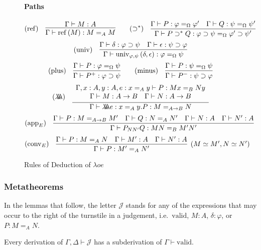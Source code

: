\documentclass[a4paper,UKenglish]{lipics-v2016}
\newcommand*{\reff}[1]{\ensuremath{\mathrm{ref} \left( {#1} \right)}}
\newcommand*{\univ}[4]{\ensuremath{\mathrm{univ}_{{#1}, {#2}} \left({#3} , {#4} \right)}}
\newcommand*{\triplelambda}{\ensuremath{\lambda \!\! \lambda \!\! \lambda}}
\newcommand*{\vald}{\ensuremath{\vdash \mathrm{valid}}}
\theoremstyle{plain}
\theoremstyle{definition}
\begin{document}
\begin{figure}
\paragraph*{Paths}
\[ (\mathrm{ref}) \quad \vcenter{\infer{\Gamma \vdash \reff{M} : M =_A M}{\Gamma \vdash M : A}}
\qquad
(\supset^*) \quad \vcenter{\infer{\Gamma \vdash P \supset^* Q : \varphi \supset \psi =_\Omega \varphi' \supset \psi'}{\Gamma \vdash P : \varphi =_\Omega \varphi' \quad \Gamma \vdash Q : \psi =_\Omega \psi'}} \]
\[ (\mathrm{univ}) \quad \vcenter{\infer{\Gamma \vdash \univ{\varphi}{\psi}{\delta}{\epsilon} : \varphi =_\Omega \psi}{\Gamma \vdash \delta : \varphi \supset \psi \quad \Gamma \vdash \epsilon : \psi \supset \varphi}} \]
\[ (\mathrm{plus}) \quad \vcenter{\infer{\Gamma \vdash P^+ : \varphi \supset \psi}{\Gamma \vdash P : \varphi =_\Omega \psi}}
\qquad
(\mathrm{minus}) \quad \vcenter{\infer{\Gamma \vdash P^- : \psi \supset \varphi}{\Gamma \vdash P : \psi =_\Omega \psi}} \]
\[ (\triplelambda) \quad \vcenter{\infer{\Gamma \vdash \triplelambda e : x =_A y . P : M =_{A \rightarrow B} N}
  {\begin{array}{c}
     \Gamma, x : A, y : A, e : x =_A y \vdash P : M x =_B N y \\
     \Gamma \vdash M : A \rightarrow B \quad
\Gamma \vdash N : A \rightarrow B
     \end{array}}} \]
\[ (\mathrm{app}_E) \quad \vcenter{\infer{\Gamma \vdash P_{NN'}Q : MN =_B M' N'}{\Gamma \vdash P : M =_{A \rightarrow B} M' \quad \Gamma \vdash Q : N =_A N' \quad \Gamma \vdash N : A \quad \Gamma \vdash N' : A}} \]
\[ (\mathrm{conv}_E) \quad \vcenter{\infer[(M \simeq M', N \simeq N')]{\Gamma \vdash P : M' =_A N'}{\Gamma \vdash P : M =_A N \quad \Gamma \vdash M' : A \quad \Gamma \vdash N' : A}} \]
\caption{Rules of Deduction of $\lambda oe$}
\label{fig:lambdaoe}
\end{figure}

\subsubsection{Metatheorems}

\label{section:meta}

In the lemmas that follow, the letter $\mathcal{J}$ stands for any of the expressions that may occur to the right of the turnstile in a judgement, i.e.~$\mathrm{valid}$, $M : A$, $\delta : \varphi$, or $P : M =_A N$.

\begin{lemma}
Every derivation of $\Gamma, \Delta \vdash \mathcal{J}$ has a subderivation of $\Gamma \vald$.
\end{lemma}
\end{document}

